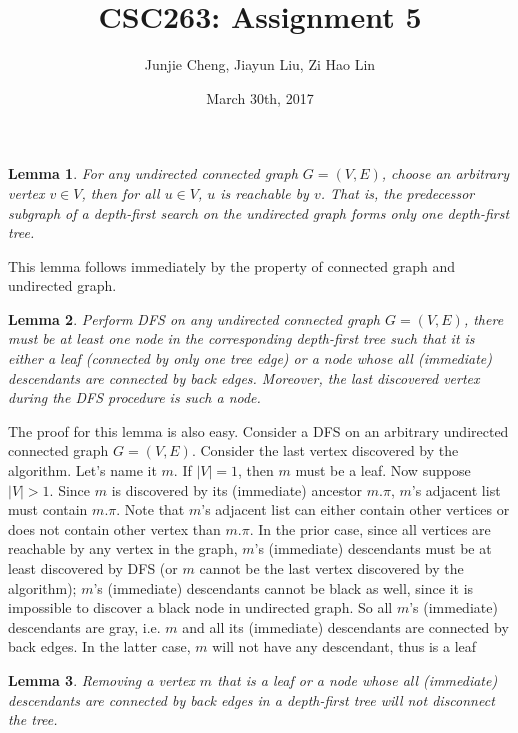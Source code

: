 \documentclass[11pt, answers]{exam}
\theoremstyle{plain}
\newtheorem{lemma}{Lemma}
\theoremstyle{definition}
\begin{document}
 


\title{CSC263: Assignment 5}
\date{March 30th, 2017}
\author{Junjie Cheng, Jiayun Liu, Zi Hao Lin}
\maketitle

\unframedsolutions

\begin{questions}
\question
\begin{solution}
\begin{lemma}
For any undirected connected graph $G=(V,E)$, choose an arbitrary vertex $v \in V$, then for all $u \in V$, $u$ is reachable by $v$. That is, the predecessor subgraph of a depth-first search on the undirected graph forms only one depth-first tree.
\end{lemma}
This lemma follows immediately by the property of connected graph and undirected graph.
\begin{lemma}
Perform DFS on any undirected connected graph $G=(V,E)$, there must be at least one node in the corresponding depth-first tree such that it is either a leaf (connected by only one tree edge) or a node whose all (immediate) descendants are connected by back edges. Moreover, the last discovered vertex during the DFS procedure is such a node.
\end{lemma}
The proof for this lemma is also easy. Consider a DFS on an arbitrary undirected connected graph $G=(V,E)$. Consider the last vertex discovered by the algorithm. Let's name it $m$. If $|V| = 1$, then $m$ must be a leaf. Now suppose $|V|>1$. Since $m$ is discovered by its (immediate) ancestor $m.\pi$, $m$'s adjacent list must contain $m.\pi$. Note that $m$'s adjacent list can either contain other vertices or does not contain other vertex than $m.\pi$. In the prior case, since all vertices are reachable by any vertex in the graph, $m$'s (immediate) descendants must be at least discovered by DFS (or $m$ cannot be the last vertex discovered by the algorithm); $m$'s (immediate) descendants cannot be black as well, since it is impossible to discover a black node in undirected graph. So all $m$'s (immediate) descendants are gray, i.e. $m$ and all its (immediate) descendants are connected by back edges. In the latter case, $m$ will not have any descendant, thus is a leaf
\begin{lemma}
Removing a vertex $m$ that is a leaf or a node whose all (immediate) descendants are connected by back edges in a depth-first tree will not disconnect the tree. 

\end{lemma}
\end{solution}
\end{questions}
\end{document}
